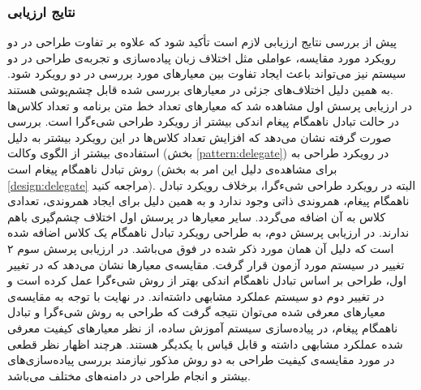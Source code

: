 \subsubsection{نتایج ارزیابی}
پیش از بررسی نتایج ارزیابی لازم است تأکید شود که علاوه بر تفاوت طراحی در دو رویکرد مورد مقایسه، عواملی مثل اختلاف زبان پیاده‌سازی و تجربه‌ی طراحی در دو سیستم نیز  می‌تواند باعث ایجاد تفاوت بین معیارهای مورد بررسی در دو رویکرد شود. به همین دلیل اختلاف‌های جزئی در معیارهای بررسی شده قابل چشم‌پوشی هستند.\\
 در ارزیابی پرسش اول مشاهده شد که معیارهای تعداد خط متن برنامه و تعداد کلاس‌ها در حالت تبادل ناهمگام پیغام اندکی بیشتر از  رویکرد طراحی شیءگرا است. بررسی صورت گرفته نشان می‌دهد که افزایش تعداد کلاس‌ها در این رویکرد بیشتر به دلیل استفاده‌ی بیشتر از الگوی وکالت (بخش \ref{pattern:delegate}) در رویکرد طراحی به روش تبادل ناهمگام پیغام است (برای مشاهده‌ی دلیل این امر به بخش  \ref{design:delegate} مراجعه کنید). البته در رویکرد طراحی شیءگرا، برخلاف رویکرد تبادل ناهمگام پیغام، همروندی ذاتی وجود ندارد و به همین دلیل برای ایجاد همروندی، تعدادی کلاس به آن اضافه می‌گردد. سایر معیارها در پرسش اول اختلاف چشم‌گیری باهم ندارند. در ارزیابی پرسش‌ دوم، به طراحی رویکرد تبادل ناهمگام یک کلاس اضافه شده است که دلیل آن همان مورد ذکر شده در فوق می‌باشد. در  ارزیابی پرسش سوم ۲ تغییر در سیستم مورد آزمون قرار گرفت. مقایسه‌ی معیارها نشان می‌دهد که در تغییر اول، طراحی بر اساس تبادل ناهمگام اندکی بهتر از روش شیءگرا عمل کرده است و در تغییر دوم دو سیستم عملکرد مشابهی داشته‌اند. در نهایت با توجه به مقایسه‌ی معیارهای معرفی شده می‌توان نتیجه گرفت که طراحی به روش شیءگرا و تبادل ناهمگام پیغام، در پیاده‌سازی سیستم آموزش ساده، از نظر معیارهای کیفیت معرفی شده عملکرد مشابهی داشته و قابل قیاس با یکدیگر هستند. هرچند اظهار نظر قطعی در مورد مقایسه‌ی  کیفیت طراحی به دو روش مذکور نیازمند بررسی‌ پیاده‌سازی‌های بیشتر و انجام طراحی در دامنه‌های مختلف می‌باشد.

